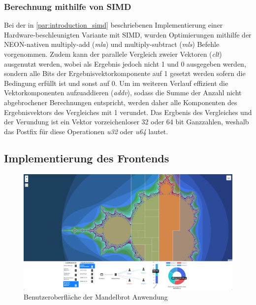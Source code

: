 \subsubsection{Berechnung mithilfe von SIMD}\label{subsec:simd}

Bei der in \autoref{par:introduction_simd} beschriebenen Implementierung einer Hardware-beschleunigten Variante mit SIMD,
wurden Optimierungen mithilfe der NEON-nativen multiply-add (\textit{mla}) und multiply-subtract (\textit{mls}) Befehle vorgenommen.
Zudem kann der parallele Vergleich zweier Vektoren (\textit{clt}) ausgenutzt werden, wobei als Ergebnis jedoch nicht 1 und 0 ausgegeben werden,
sondern alle Bits der Ergebnisvektorkomponente auf 1 gesetzt werden sofern die Bedingung erfüllt ist und sonst auf 0.
Um im weiteren Verlauf effizient die Vektorkomponenten aufzuaddieren (\textit{addv}), sodass die Summe der Anzahl nicht abgebrochener Berechnungen entspricht,
werden daher alle Komponenten des Ergebnisvektors des Vergleiches mit 1 verundet.
Das Ergbenis des Vergleiches und der Verundung ist ein Vektor vorzeichenloser 32 oder 64 bit Ganzzahlen, weshalb das
Postfix für diese Operationen \textit{u32} oder \textit{u64} lautet.

\begin{figure}
	
\end{figure}


\subsection{Implementierung des Frontends}

\begin{figure}[h!]
	\centering
	\includegraphics[width=\linewidth]{img/Implementierung/UI-Screenshot}
	\caption{Benutzeroberfläche der Mandelbrot Anwendung}
	\label{fig:ui-screenshot}
\end{figure}

